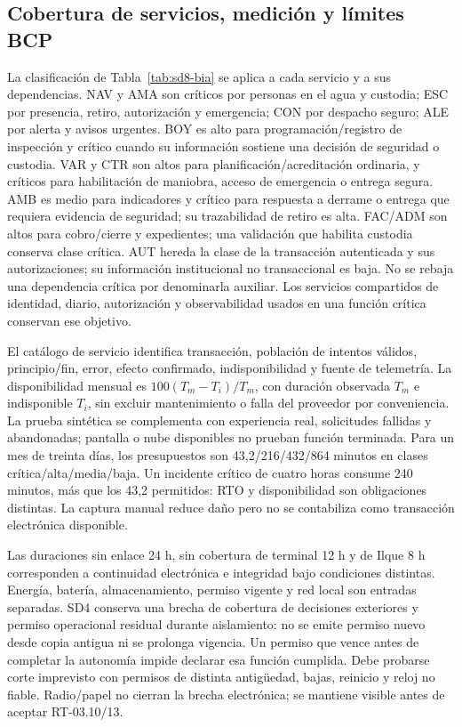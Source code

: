 \subsection{Cobertura de servicios, medición y límites BCP}\label{sec:sd8-bcp-cobertura-p07}
La clasificación de Tabla~\ref{tab:sd8-bia} se aplica a cada servicio y a sus dependencias. NAV y AMA son críticos por personas en el agua y custodia; ESC por presencia, retiro, autorización y emergencia; CON por despacho seguro; ALE por alerta y avisos urgentes. BOY es alto para programación/registro de inspección y crítico cuando su información sostiene una decisión de seguridad o custodia. VAR y CTR son altos para planificación/acreditación ordinaria, y críticos para habilitación de maniobra, acceso de emergencia o entrega segura. AMB es medio para indicadores y crítico para respuesta a derrame o entrega que requiera evidencia de seguridad; su trazabilidad de retiro es alta. FAC/ADM son altos para cobro/cierre y expedientes; una validación que habilita custodia conserva clase crítica. AUT hereda la clase de la transacción autenticada y sus autorizaciones; su información institucional no transaccional es baja. No se rebaja una dependencia crítica por denominarla auxiliar. Los servicios compartidos de identidad, diario, autorización y observabilidad usados en una función crítica conservan ese objetivo. \parencite[RT-10.02; p.~22]{sd8-bt}

El catálogo de servicio identifica transacción, población de intentos válidos, principio/fin, error, efecto confirmado, indisponibilidad y fuente de telemetría. La disponibilidad mensual es $100(T_m-T_i)/T_m$, con duración observada $T_m$ e indisponible $T_i$, sin excluir mantenimiento o falla del proveedor por conveniencia. La prueba sintética se complementa con experiencia real, solicitudes fallidas y abandonadas; pantalla o nube disponibles no prueban función terminada. Para un mes de treinta días, los presupuestos son 43,2/216/432/864 minutos en clases crítica/alta/media/baja. Un incidente crítico de cuatro horas consume 240 minutos, más que los 43,2 permitidos: RTO y disponibilidad son obligaciones distintas. La captura manual reduce daño pero no se contabiliza como transacción electrónica disponible. \parencites[arts.~20 y 78; pp.~14--15, 40]{sd8-ba}[1.7; RT-10.01; pp.~5, 22]{sd8-bt}

Las duraciones sin enlace 24 h, sin cobertura de terminal 12 h y de Ilque 8 h corresponden a continuidad electrónica e integridad bajo condiciones distintas. Energía, batería, almacenamiento, permiso vigente y red local son entradas separadas. SD4 conserva una brecha de cobertura de decisiones exteriores y permiso operacional residual durante aislamiento: no se emite permiso nuevo desde copia antigua ni se prolonga vigencia. Un permiso que vence antes de completar la autonomía impide declarar esa función cumplida. Debe probarse corte imprevisto con permisos de distinta antigüedad, bajas, reinicio y reloj no fiable. Radio/papel no cierran la brecha electrónica; se mantiene visible antes de aceptar RT-03.10/13. \parencite[cap.~15, autonomía y sincronización RT-03.10/13, p.~33; emplazamiento RT-06.01, p.~34]{sd8-c07}

